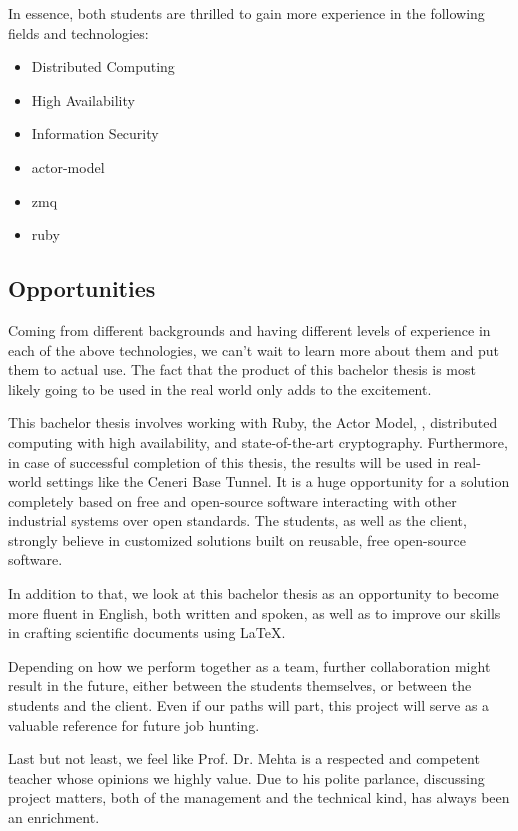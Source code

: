 \noindent
In essence, both students are thrilled to gain more experience in the following
fields and technologies:

\begin{itemize}
	\item Distributed Computing
	\item High Availability
	\item Information Security
	\item \gls{actor-model}
	\item \gls{zmq}
	\item \gls{ruby}
\end{itemize}

\subsection*{Opportunities}
Coming from different backgrounds and having different levels of experience in
each of the above technologies, we can't wait to learn more about them and put
them to actual use. The fact that the product of this bachelor thesis is most
likely going to be used in the real world only adds to the excitement.

This bachelor thesis involves working with Ruby, the Actor Model, \zmq,
distributed computing with high availability, and state-of-the-art
cryptography. Furthermore, in case of successful completion of this thesis, the results will be used in real-world settings like the Ceneri
Base Tunnel. It is a huge opportunity for a solution completely based on free
and open-source software interacting with other industrial systems over open standards. The students, as well as the client, strongly believe
in customized solutions built on reusable, free open-source software.

In addition to that, we look at this bachelor thesis as an opportunity to
become more fluent in English, both written and spoken, as well as to improve
our skills in crafting scientific documents using {\LaTeX}.

Depending on how we perform together as a team, further collaboration might
result in the future, either between the students themselves, or between the
students and the client. Even if our paths will part, this project will
serve as a valuable reference for future job hunting.

Last but not least, we feel like Prof. Dr. Mehta is a respected and competent
teacher whose opinions we highly value. Due to his polite parlance, discussing
project matters, both of the management and the technical kind, has always been
an enrichment.

